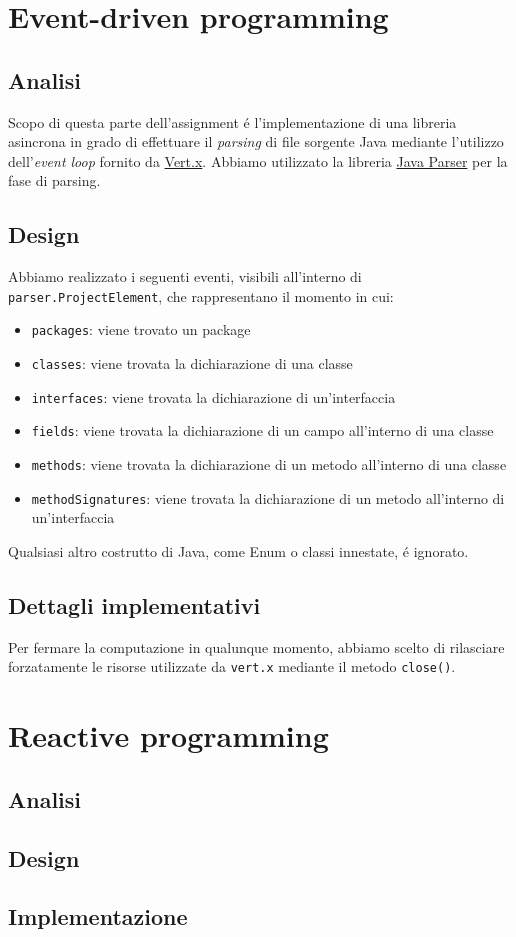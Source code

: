 \documentclass[12pt,a4paper,oneside]{article}
\begin{document}
	\section{Event-driven programming}
	\subsection{Analisi}
	Scopo di questa parte dell'assignment \'e l'implementazione di una libreria asincrona in grado di effettuare il \emph{parsing} di file sorgente Java mediante l'utilizzo dell'\emph{event loop} fornito da \href{https://vertx.io/}{Vert.x}. Abbiamo utilizzato la libreria \href{https://javaparser.org/}{Java Parser} per la fase di parsing.
	
	\subsection{Design}
	Abbiamo realizzato i seguenti eventi, visibili all'interno di \texttt{parser.ProjectElement}, che rappresentano il momento in cui:
	\begin{itemize}
		\item \texttt{packages}: viene trovato un package
		\item \texttt{classes}: viene trovata la dichiarazione di una classe
		\item \texttt{interfaces}: viene trovata la dichiarazione di un'interfaccia
		\item \texttt{fields}: viene trovata la dichiarazione di un campo all'interno di una classe
		\item \texttt{methods}: viene trovata la dichiarazione di un metodo all'interno di una classe
		\item \texttt{methodSignatures}: viene trovata la dichiarazione di un metodo all'interno di un'interfaccia
	\end{itemize}
	Qualsiasi altro costrutto di Java, come Enum o classi innestate, \'e ignorato.
	
	\subsection{Dettagli implementativi}
	Per fermare la computazione in qualunque momento, abbiamo scelto di rilasciare forzatamente le risorse utilizzate da \texttt{vert.x} mediante il metodo \texttt{close()}.
	
	\section{Reactive programming}
	\subsection{Analisi}
	\subsection{Design}
	\subsection{Implementazione}
\end{document}
